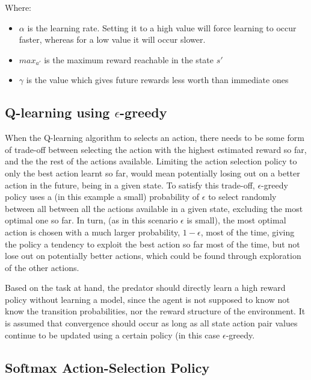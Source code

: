 \documentclass[11pt]{article}
\begin{document}
\noindent Where:
\begin{itemize}
	\item $\alpha$ is the learning rate. Setting it to a high value will force learning to occur faster, whereas for a low value it will occur slower.
	\item $max_{a'}$ is the maximum reward reachable in the state $s'$
	\item $\gamma$ is the value which gives future rewards less worth than immediate ones
\end{itemize}
\vspace*{10mm}


\subsection{Q-learning using $\epsilon$-greedy}

When the Q-learning algorithm to selects an action, there needs to be some form of trade-off between selecting the action with the highest estimated reward so far, and the the rest of the actions available. Limiting the action selection policy to only the best action learnt so far, would mean potentially losing out  on a better action in the future, being in a given state. To satisfy this trade-off, $\epsilon$-greedy policy uses a (in this example a small) probability of $\epsilon$ to select randomly between all  between all the actions available in a given state, excluding the most optimal one so far. In turn, (as in this scenario $\epsilon$ is small), the most optimal action is chosen with a much larger probability, $1-\epsilon$, most of the time, giving the policy a tendency to exploit the best action so far most of the time, but not lose out on potentially better actions, which could be found through exploration of the other actions. 



Based on the task at hand, the predator should directly learn a high reward policy without learning a model, since the agent is not supposed to know not know the transition probabilities, nor the reward structure of the environment. It is assumed that convergence should occur as long as all state action pair values continue to be updated using a certain policy (in this case $\epsilon$-greedy. 





\subsection{Softmax Action-Selection Policy}
\end{document}
